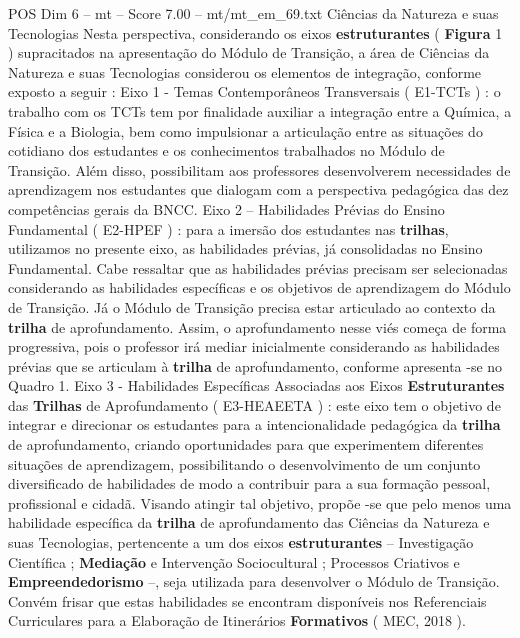 \begin{textsample}{POS Dim 6 – mt – Score 7.00 – mt/mt\_em\_69.txt}  \label{ex:f6_pos_170}
Ciências da Natureza e suas Tecnologias Nesta perspectiva, considerando os eixos \textbf{estruturantes} ( \textbf{Figura} 1 ) supracitados na apresentação do Módulo de Transição, a área de Ciências da Natureza e suas Tecnologias considerou os elementos de integração, conforme exposto a seguir : Eixo 1 - Temas Contemporâneos Transversais ( E1-TCTs ) : o trabalho com os TCTs tem por finalidade auxiliar a integração entre a Química, a Física e a Biologia, bem como impulsionar a articulação entre as situações do cotidiano dos estudantes e os conhecimentos trabalhados no Módulo de Transição.
Além disso, possibilitam aos professores desenvolverem necessidades de aprendizagem nos estudantes que dialogam com a perspectiva pedagógica das dez competências gerais da BNCC.
Eixo 2 – Habilidades Prévias do Ensino Fundamental ( E2-HPEF ) : para a imersão dos estudantes nas \textbf{trilhas}, utilizamos no presente eixo, as habilidades prévias, já consolidadas no Ensino Fundamental.
Cabe ressaltar que as habilidades prévias precisam ser selecionadas considerando as habilidades específicas e os objetivos de aprendizagem do Módulo de Transição.
Já o Módulo de Transição precisa estar articulado ao contexto da \textbf{trilha} de aprofundamento.
Assim, o aprofundamento nesse viés começa de forma progressiva, pois o professor irá mediar inicialmente considerando as habilidades prévias que se articulam à \textbf{trilha} de aprofundamento, conforme apresenta -se no Quadro 1.
Eixo 3 - Habilidades Específicas Associadas aos Eixos \textbf{Estruturantes} das \textbf{Trilhas} de Aprofundamento ( E3-HEAEETA ) : este eixo tem o objetivo de integrar e direcionar os estudantes para a intencionalidade pedagógica da \textbf{trilha} de aprofundamento, criando oportunidades para que experimentem diferentes situações de aprendizagem, possibilitando o desenvolvimento de um conjunto diversificado de habilidades de modo a contribuir para a sua formação pessoal, profissional e cidadã.
Visando atingir tal objetivo, propõe -se que pelo menos uma habilidade específica da \textbf{trilha} de aprofundamento das Ciências da Natureza e suas Tecnologias, pertencente a um dos eixos \textbf{estruturantes} – Investigação Científica ; \textbf{Mediação} e Intervenção Sociocultural ; Processos Criativos e \textbf{Empreendedorismo} –, seja utilizada para desenvolver o Módulo de Transição.
Convém frisar que estas habilidades se encontram disponíveis nos Referenciais Curriculares para a Elaboração de Itinerários \textbf{Formativos} ( MEC, 2018 ).

\end{textsample}
